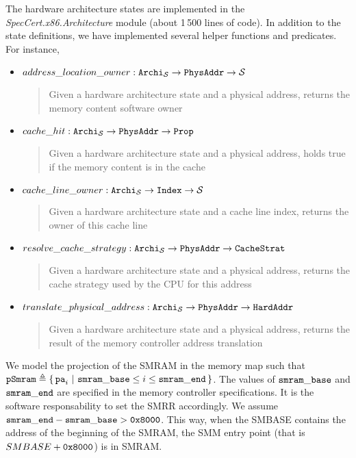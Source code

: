 The hardware architecture states are implemented in the
\emph{SpecCert.x86.Archi\-tecture} module (about 1\,500 lines of code). In
addition to the state definitions, we have implemented several helper functions
and predicates. For instance,
\begin{itemize}
\item[] $address\_location\_owner : \texttt{Archi}_{\mathcal{S}} \rightarrow
  \texttt{PhysAddr} \rightarrow \mathcal{S}$
    \begin{quote}
      \small Given a hardware architecture state and a physical address,
      returns the memory content software owner
    \end{quote}
\item[] $cache\_hit : \texttt{Archi}_{\mathcal{S}} \rightarrow
  \texttt{PhysAddr} \rightarrow \texttt{Prop}$
    \begin{quote}
      \small Given a hardware architecture state and a physical address,
      holds true if the memory content is in the cache
    \end{quote}
\item[] $cache\_line\_owner : \texttt{Archi}_{\mathcal{S}} \rightarrow
  \texttt{Index} \rightarrow \mathcal{S}$
    \begin{quote}
      \small Given a hardware architecture state and a cache line index,
      returns the owner of this cache line
    \end{quote}
\item[] $resolve\_cache\_strategy : \texttt{Archi}_{\mathcal{S}} \rightarrow
  \texttt{PhysAddr} \rightarrow \texttt{CacheStrat}$
    \begin{quote}
      \small Given a hardware architecture state and a physical address,
      returns the cache strategy used by the CPU for this address
    \end{quote}
\item[] $translate\_physical\_address : \texttt{Archi}_{\mathcal{S}} \rightarrow
  \texttt{PhysAddr} \rightarrow \texttt{HardAddr}$
    \begin{quote}
      \small Given a hardware architecture state and a physical address,
      returns the result of the memory controller address translation
    \end{quote}
\end{itemize}

We model the projection of the SMRAM in the memory map such that
$\texttt{pSmram} \triangleq \{\,\mathtt{pa}_i\ |\ \mathtt{smram\_base} \leq i \le
  \mathtt{smram\_end}\,\}$.  The values of $\mathtt{smram\_base}$ and $\mathtt{smram\_end}$
are specified in the memory controller specifications. It is the software
responsability to set the SMRR accordingly. We assume
$\mathtt{smram\_end} - \mathtt{smram\_base} > \mathtt{0x8000}$. This way, when the SMBASE
contains the address of the beginning of the SMRAM, the SMM entry point (that is
$SMBASE + \mathtt{0x8000}$) is in SMRAM.

